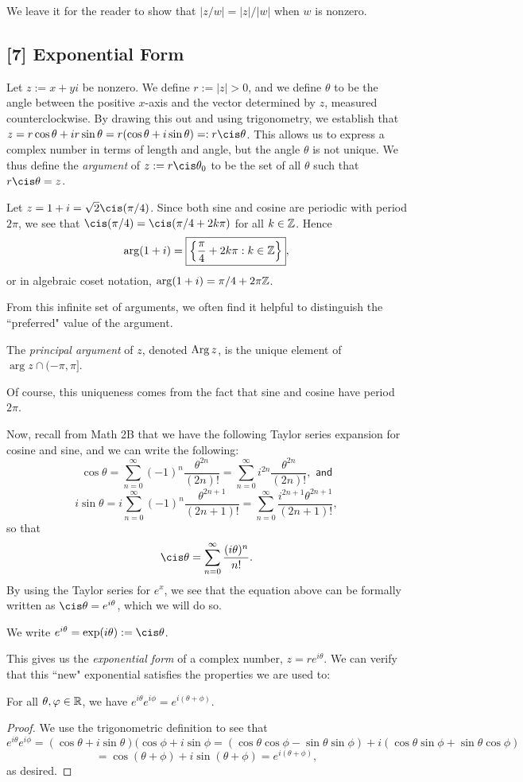 \documentclass{article}
\begin{document}
We leave it for the reader to show that $|z/w| = |z|/|w|$ when $w$ is nonzero. \newpage
\subsection*{[7] Exponential Form}
Let $z:= x+yi$ be nonzero. We define $r := |z| > 0$, and we define $\theta$ to be the angle between the positive $x$-axis and the vector determined by $z$, measured counterclockwise. By drawing this out and using trigonometry, we establish that
$z = r\cos \theta + ir\sin \theta  = r(\cos \theta + i\sin\theta) =: r\cis \theta$. This allows us to express a complex number in terms of length and angle, but the angle $\theta$ is not unique. We thus define the \textit{argument} of $z := r\cis\theta_0$ to be the set of all $\theta$ such that $r\cis\theta = z$.
\begin{example}
Let $z = 1+i = \sqrt 2\cis(\pi/4)$. Since both sine and cosine are periodic with period $2\pi$, we see that $\cis(\pi/4) = \cis(\pi/4 + 2k\pi)$ for all $k\in\mathbb Z$. Hence
$$\arg(1+i) = \boxed{\left\{\frac\pi4 + 2k\pi: k\in\mathbb Z\right\}},$$
or in algebraic coset notation, $\arg(1+i) = \pi/4 + 2\pi\mathbb Z$.
\end{example}
From this infinite set of arguments, we often find it helpful to distinguish the ``preferred" value of the argument.
\begin{definition}
The \textit{principal argument} of $z$, denoted $\operatorname{Arg} z$, is the unique element of $\arg z\cap (-\pi, \pi]$.
\end{definition}
Of course, this uniqueness comes from the fact that sine and cosine have period $2\pi$.

Now, recall from Math 2B that we have the following Taylor series expansion for cosine and sine, and we can write the following:
$$\cos\theta =  \sum_{n=0} ^\infty (-1)^n \frac{\theta^{2n}}{(2n)!} = \sum_{n=0}^\infty i^{2n}\frac{\theta^{2n}}{(2n)!},\textsf{ and}$$
$$i\sin\theta = i\sum_{n=0}^\infty (-1)^n \frac{\theta^{2n+1}}{(2n+1)!} = \sum_{n=0}^\infty \frac{i^{2n+1}\theta^{2n+1}}{(2n+1)!},$$
so that
$$\cis\theta = \sum_{n=0}^\infty \frac{(i\theta)^n}{n!}.$$
By using the Taylor series for $e^x$, we see that the equation above can be formally written as $\cis \theta = e^{i\theta}$, which we will do so.
\begin{definition}
We write $e^{i\theta} = \exp(i\theta) := \cis \theta$.
\end{definition}
This gives  us the \textit{exponential form} of a complex number, $z = re^{i\theta}$. We can verify that this ``new" exponential satisfies the properties we are used to:
\begin{proposition}
For all $\theta,\varphi\in\mathbb R$, we have $e^{i\theta} e^{i\phi} = e^{i(\theta+\phi)}$.
\end{proposition}
\begin{proof}
We use the trigonometric definition to see that
$$e^{i\theta}e^{i\phi} = (\cos\theta + i\sin\theta) (\cos\phi+i\sin\phi = (\cos\theta \cos\phi-\sin\theta\sin\phi) + i(\cos\theta \sin\phi +\sin\theta\cos\phi)$$
$$=\cos(\theta+\phi) + i\sin(\theta+\phi) = e^{i (\theta+\phi)},$$
as desired.
\end{proof}
\newpage
\setcounter{section}{12}
\end{document}
